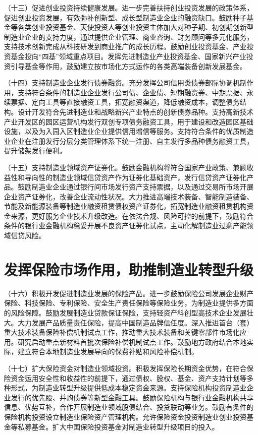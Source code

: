 （十三）促进创业投资持续健康发展。进一步完善扶持创业投资发展的政策体系，促进创业投资发展，有效弥补创新型、成长型制造业企业的融资缺口。鼓励种子基金等各类创业投资基金、天使投资人等创业投资主体加大对种子期、初创期创新型制造业企业的支持力度，通过提供企业管理、商业咨询、财务顾问等多元化服务，支持技术创新完成从科技研发到商业推广的成长历程。鼓励创业投资基金、产业投资基金投向“四基”领域重点项目。发挥先进制造业产业投资基金、国家新兴产业投资引导基金等作用，鼓励建立按市场化方式运作的各类高端装备创新发展基金。

（十四）支持制造业企业发行债券融资。充分发挥公司信用类债券部际协调机制作用，支持符合条件的制造业企业发行公司债、企业债、短期融资券、中期票据、永续票据、定向工具等直接融资工具，拓宽融资渠道，降低融资成本，调整债务结构。设计开发符合先进制造业和战略新兴产业特点的创新债券品种。支持高新技术产业开发区的园区运营机构发行双创专项债务融资工具，用于建设和改造园区基础设施，以及为入园入区制造业企业提供信用增信等服务。支持符合条件的优质制造业企业在注册发行分层分类管理体系下统一注册、自主发行多品种债务融资工具，提升储架发行便利。

（十五）支持制造业领域资产证券化。鼓励金融机构将符合国家产业政策、兼顾收益性和导向性的制造业领域信贷资产作为证券化基础资产，发行信贷资产证券化产品。鼓励制造业企业通过银行间市场发行资产支持票据，以及通过交易所市场开展企业资产证券化，改善企业流动性状况。大力推进高端技术装备、智能制造装备、节能及新能源装备等制造业融资租赁债权资产证券化，拓宽制造业融资租赁机构资金来源，更好服务企业技术升级改造。在依法合规、风险可控的前提下，鼓励符合条件的银行业金融机构稳妥开展不良资产证券化试点，主动化解制造业过剩产能领域信贷风险。

\section{发挥保险市场作用，助推制造业转型升级}

（十六）积极开发促进制造业发展的保险产品。进一步鼓励保险公司发展企业财产保险、科技保险、专利保险、安全生产责任保险等保险业务，为制造业提供多方面的风险保障。鼓励发展制造业贷款保证保险，支持轻资产科创型高技术企业发展壮大。大力发展产品质量责任保险，提高中国制造品牌信任度。深入推进首台（套）重大技术装备保险补偿机制试点工作，推动重大技术装备和关键零部件市场化应用。研究启动重点新材料首批次保险补偿机制试点工作。鼓励地方政府结合本地实际，建立符合本地制造业发展导向的保费补贴和风险补偿机制。

（十七）扩大保险资金对制造业领域投资。积极发挥保险长期资金优势，在符合保险资金运用安全性和收益性的前提下，通过债权、股权、基金、资产支持计划等多种形式，为制造业转型升级提供低成本稳定资金来源。支持保险机构投资制造业企业发行的优先股、并购债券等新型金融工具。鼓励保险机构与银行业金融机构共享信息、优势互补，合作开展制造业领域股债结合、投贷联动等业务。鼓励有条件的保险机构投资设立制造业保险资产管理机构。允许保险资金投资制造业创业投资基金等私募基金。扩大中国保险投资基金对制造业转型升级项目的投入。

